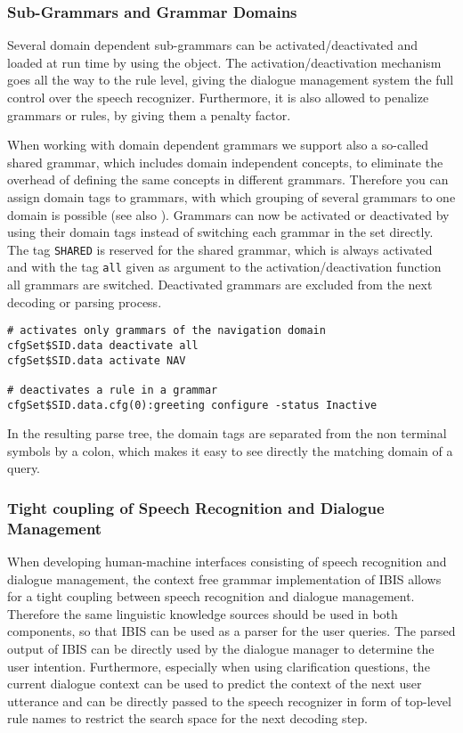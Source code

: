 \subsubsection{Sub-Grammars and Grammar Domains}

Several domain dependent sub-grammars can be activated/deactivated and
loaded at run time by using the  object. The
activation/de\-activation mechanism goes all the way to the rule
level, giving the dialogue management system the full control over the
speech recognizer. Furthermore, it is also allowed to penalize
grammars or rules, by giving them a penalty factor.

When working with domain dependent grammars we support also a
so-called shared grammar, which includes domain independent concepts,
to eliminate the overhead of defining the same concepts in different
grammars. Therefore you can assign domain tags to grammars, with
which grouping of several grammars to one domain is possible (see
also ). Grammars can now be activated or
deactivated by using their domain tags instead of switching each
grammar in the set directly. The tag \texttt{SHARED} is reserved for
the shared grammar, which is always activated and with the tag
\texttt{all} given as argument to the activation/deactivation function
all grammars are switched.  Deactivated grammars are excluded from the
next decoding or parsing process.

\begin{verbatim}
# activates only grammars of the navigation domain
cfgSet$SID.data deactivate all
cfgSet$SID.data activate NAV

# deactivates a rule in a grammar
cfgSet$SID.data.cfg(0):greeting configure -status Inactive
\end{verbatim}

In the resulting parse tree, the domain tags are separated from the
non terminal symbols by a colon, which makes it easy to see directly
the matching domain of a query.


\subsubsection{Tight coupling of Speech Recognition and Dialogue Management}

When developing human-machine interfaces consisting of speech
recognition and dialogue management, the context free grammar
implementation of IBIS allows for a tight coupling between speech
recognition and dialogue management. Therefore the same linguistic
knowledge sources should be used in both components, so that IBIS can
be used as a parser for the user queries. The parsed output of IBIS
can be directly used by the dialogue manager to determine the user
intention. Furthermore, especially when using clarification questions,
the current dialogue context can be used to predict the context of the
next user utterance and can be directly passed to the speech
recognizer in form of top-level rule names to restrict the search
space for the next decoding step\cite{fuegen:icslp04}.

